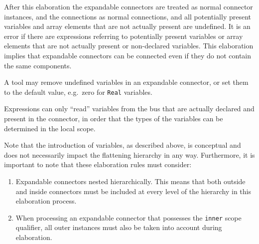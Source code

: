 After this elaboration the expandable connectors are treated as normal connector instances, and the connections as normal connections, and all potentially present variables and array elements that are not actually present are undefined.
It is an error if there are expressions referring to potentially present variables or array elements that are not actually present or non-declared variables.
This elaboration implies that expandable connectors can be connected even if they do not contain the same components.

\begin{nonnormative}
A tool may remove undefined variables in an expandable connector, or set them to the default value, e.g.\ zero for \lstinline!Real! variables.
\end{nonnormative}

\begin{nonnormative}
Expressions can only ``read'' variables from the bus that are actually declared and present in the connector, in order that the types of the variables can be determined in the local scope.
\end{nonnormative}

\begin{nonnormative}
Note that the introduction of variables, as described above, is conceptual and does not necessarily impact the flattening hierarchy in any way.
Furthermore, it is important to note that these elaboration rules must consider:
\begin{enumerate}
\item
  Expandable connectors nested hierarchically.
  This means that  both outside and inside connectors must be included at every level of the hierarchy in this elaboration process.
\item
  When processing an expandable connector that possesses the \lstinline!inner! scope qualifier, all outer instances must also be taken into account during elaboration.
\end{enumerate}
\end{nonnormative}

